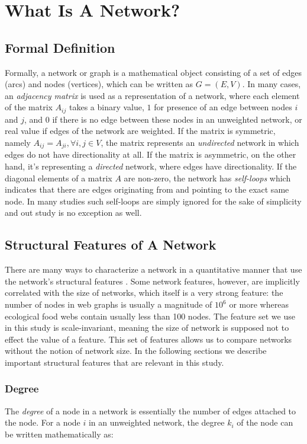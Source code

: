 \documentclass{article}
\begin{document}
\section{What Is A Network?}
	\subsection{Formal Definition}
	Formally, a network or graph is a mathematical object consisting of a set of edges (arcs) and nodes (vertices), which can be written as $G = (E,V)$. In many cases, an \textit{adjacency matrix} is used as a representation of a network, where each element of the matrix $A_{ij}$ takes a binary value, $1$ for presence of an edge between nodes $i$ and $j$, and $0$ if there is no edge between these nodes in an unweighted network, or real value if edges of the network are weighted. If the matrix is symmetric, namely $A_{ij} = A_{ji},  \forall i,j \in V$, the matrix represents an \textit{undirected} network in which edges do not have directionality at all. If the matrix is asymmetric, on the other hand, it's representing a \textit{directed} network, where edges have directionality. If the diagonal elements of a matrix $A$ are non-zero, the network has \textit{self-loops} which indicates that there are edges originating from and pointing to the exact same node. In many studies such self-loops are simply ignored for the sake of simplicity and out study is no exception as well.
	
	\subsection{Structural Features of A Network}
	There are many ways to characterize a network in a quantitative manner that use the network's structural features \cite{Newman:NetworksIntro,NetworkCharacterizationSurvey}. Some network features, however, are implicitly correlated with the size of networks, which itself is a very strong feature: the number of nodes in web graphs is usually a magnitude of $10^6$ or more whereas ecological food webs contain usually less than 100 nodes. The feature set we use in this study is scale-invariant, meaning the size of network is supposed not to effect the value of a feature. This set of features allows us to compare networks without the notion of network size. In the following sections we describe important structural features that are relevant in this study.
		
	 
	\subsubsection{Degree}
	The \textit{degree} of a node in a network is essentially the number of edges attached to the node. For a node $i$ in an unweighted network, the degree $k_i$ of the node can be written mathematically as:
	
\end{document}
